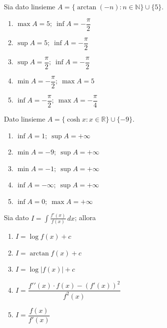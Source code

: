 \begin{quiz}
Sia dato l\textquotesingle insieme $A=\{\arctan(-n):n\in\mathbb N\}\cup\{5\}$.
\begin{enumerate}
\item $\max A=5;\ \inf A=-\dfrac\pi2$
\item $\sup A=5;\ \inf A=-\dfrac\pi2$
\item $\sup A=\dfrac\pi2;\ \inf A=-\dfrac\pi2$
\item $\min A=-\dfrac\pi2;\ \max A=5$
\item $\inf A=-\dfrac\pi2;\ \max A=-\dfrac\pi4$
\end{enumerate}
\end{quiz}

\begin{quiz}
Dato l\textquotesingle insieme $A=\{\cosh x:x\in\mathbb R\}\cup\{-9\}$.
\begin{enumerate}
\item $\inf A=1;\ \sup A=+\infty$
\item $\min A=-9;\ \sup A=+\infty$
\item $\min A=-1;\ \sup A=+\infty$
\item $\inf A=-\infty;\ \sup A=+\infty$
\item $\inf A=0;\ \max A=+\infty$
\end{enumerate}
\end{quiz}

\begin{quiz}
Sia dato $\displaystyle I=\int\frac{f\prime(x)}{f(x)}\,dx$; allora
\begin{enumerate}
\item $I=\log f(x)+c$
\item $I=\arctan f(x)+c$
\item $I=\log|f(x)|+c$
\item $I=\dfrac{f\prime\prime(x)\cdot f(x)-(f\prime(x))^2}{f^2(x)}$
\item $I=\dfrac{f(x)}{f\prime(x)}$
\end{enumerate}
\end{quiz}

